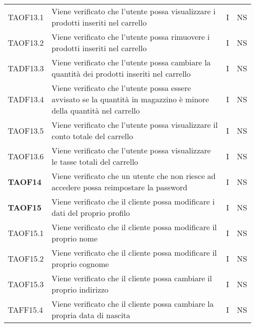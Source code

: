 \begin{center}
\begin{longtable}[!h]{p{60px} p{240px} p{35px} p{35px}}
        TAOF13.1        & Viene verificato che l'utente possa visualizzare i prodotti inseriti nel carrello                                    & I             & NS              \\
        TAOF13.2        & Viene verificato che l'utente possa rimuovere i prodotti inseriti nel carrello                                       & I             & NS              \\
        TADF13.3        & Viene verificato che l'utente possa cambiare la quantità dei prodotti inseriti nel carrello                          & I             & NS              \\
        TADF13.4        & Viene verificato che l'utente possa essere avvisato se la quantità in magazzino è minore della quantità nel carrello & I             & NS              \\
        TAOF13.5        & Viene verificato che l'utente possa visualizzare il conto totale del carrello                                        & I             & NS              \\
        TAOF13.6        & Viene verificato che l'utente possa visualizzare le tasse totali del carrello                                        & I             & NS              \\
        \textbf{TAOF14} & Viene verificato che un utente che non riesce ad accedere possa reimpostare la password                              & I             & NS              \\
        \textbf{TAOF15} & Viene verificato che il cliente possa modificare i dati del proprio profilo                                          & I             & NS              \\
        TAOF15.1        & Viene verificato che il cliente possa modificare il proprio nome                                                     & I             & NS              \\
        TAOF15.2        & Viene verificato che il cliente possa modificare il proprio cognome                                                  & I             & NS              \\
        TAOF15.3        & Viene verificato che il cliente possa cambiare il proprio indirizzo                                                  & I             & NS              \\
        TAFF15.4        & Viene verificato che il cliente possa cambiare la propria data di nascita                                            & I             & NS              \\

\end{longtable}
\end{center}
